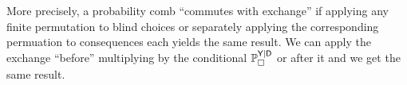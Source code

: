 








More precisely, a probability comb ``commutes with exchange'' if applying any finite permutation to blind choices or separately applying the corresponding permuation to consequences each yields the same result. We can apply the exchange ``before'' multiplying by the conditional $\mathbb{P}_{\square}^{\mathsf{Y}|\mathsf{D}}$ or after it and we get the same result.

